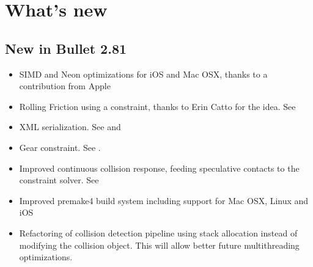 \section{What's new}
\subsection{New in Bullet 2.81}
\begin{itemize}
	\item SIMD and Neon optimizations for iOS and Mac OSX, thanks to a contribution from Apple
	\item Rolling Friction using a constraint, thanks to Erin Catto for the idea. See 
	\item XML serialization. See  and 
	\item Gear constraint. See .
	\item Improved continuous collision response, feeding speculative contacts to the constraint solver. See 
	\item Improved premake4 build system including support for Mac OSX, Linux and iOS
	\item Refactoring of collision detection pipeline using stack allocation instead of modifying the collision object. This will allow better future multithreading optimizations.
\end{itemize}

